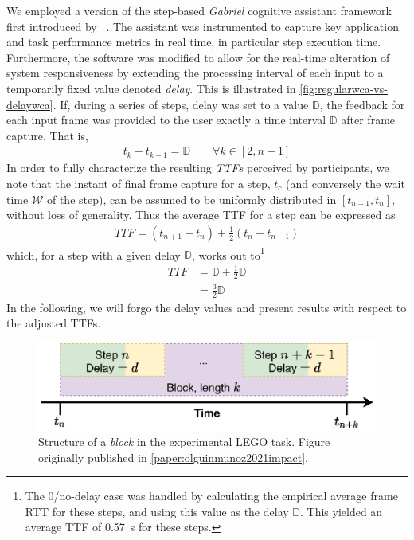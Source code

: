 We employed a version of the step-based \emph{Gabriel} cognitive assistant framework first introduced by \citeauthor{chen2018application}~\cite{chen2018application}.
The assistant was instrumented to capture key application and task performance metrics in real time, in particular step execution time.
Furthermore, the software was modified to allow for the real-time alteration of system responsiveness by extending the processing interval of each input to a temporarily fixed value denoted \emph{delay}.
This is illustrated in \cref{fig:regularwca-vs-delaywca}.
If, during a series of steps, delay was set to a value \ensuremath{\mathbb{D}}, the feedback for each input frame was provided to the user exactly a time interval \ensuremath{\mathbb{D}} after frame capture.
That is,
\begin{align}
    t_k - t_{k - 1} = \mathbb{D} \qquad \forall k \in [2, n + 1]
\end{align}
In order to fully characterize the resulting \emph{\glspl{TTF}} perceived by participants, we note that the instant of final frame capture for a step, \ensuremath{t_c} (and conversely the wait time \( \mathcal{W} \) of the step), can be assumed to be uniformly distributed in \( [t_{n - 1}, t_n] \), without loss of generality.
Thus the average \gls{TTF} for a step can be expressed as
\begin{align*}
    TTF = (t_{n + 1} - t_{n}) + \frac{1}{2}(t_n - t_{n - 1})
\end{align*}
which, for a step with a given delay \ensuremath{\mathbb{D}}, works out to\footnote{%
    The \num{0}/no-delay case was handled by calculating the empirical average frame \gls{RTT} for these steps, and using this value as the delay \ensuremath{\mathbb{D}}.
    This yielded an average \gls{TTF} of \SI{0.57}{\second} for these steps.
}
\begin{align}
    TTF &= \mathbb{D} + \frac{1}{2}\mathbb{D}\nonumber\\
    &= \frac{3}{2}\mathbb{D}
\end{align}
In the following, we will forgo the delay values and present results with respect to the adjusted \glspl{TTF}.

\begin{figure}[tb]
    \centering
    \includegraphics[width=.6\textwidth]{publications/2021ImpactDelayedResponse/Fig4c}
    \caption{%
        Structure of a \emph{block} in the experimental LEGO task.
        Figure originally published in \cref{paper:olguinmunoz2021impact}.
    }\label{fig:stepblock}
\end{figure}

